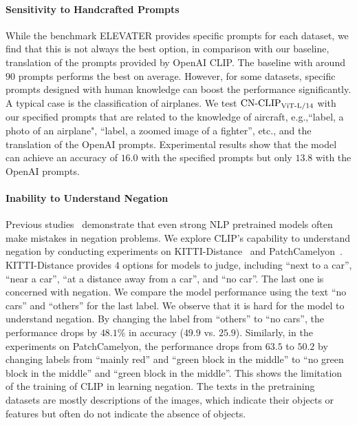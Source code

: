 \paragraph{Sensitivity to Handcrafted Prompts}
While the benchmark ELEVATER provides specific prompts for each dataset, we find that this is not always the best option, in comparison with our baseline, translation of the prompts provided by OpenAI CLIP. 
The baseline with around $90$ prompts performs the best on average. 
However, for some datasets, specific prompts designed with human knowledge can boost the performance significantly. 
A typical case is the classification of airplanes. 
We test $\text{CN-CLIP}\rm_{ViT\text{-}L/14}$ with our specified prompts that are related to the knowledge of aircraft, e.g.,``{label}, a photo of an airplane", ``{label}, a zoomed image of a fighter'', etc., and the translation of the OpenAI prompts.
Experimental results show that the model can achieve an accuracy of $16.0$ with the specified prompts but only $13.8$ with the OpenAI prompts. 


\paragraph{Inability to Understand Negation}
Previous studies~\citep{negbert, bertnot} demonstrate that even strong NLP pretrained models  often make mistakes in negation problems. 
We explore CLIP's capability to understand negation by conducting experiments on KITTI-Distance~\citep{kitti} and PatchCamelyon~\citep{patchcamelyon}. 
KITTI-Distance provides $4$ options for models to judge, including ``next to a car'', ``near a car'', ``at a distance away from a car'', and ``no car''. The last one is concerned with negation. 
We compare the model performance using the text ``no cars'' and ``others'' for the last label. 
We observe that it is hard for the model to understand negation. By changing the label from ``others'' to ``no cars'', the performance drops by $48.1\%$ in accuracy ($49.9$ vs. $25.9$). 
Similarly, in the experiments on PatchCamelyon, the performance drops from $63.5$ to $50.2$ by changing labels from ``mainly red'' and ``green block in the middle'' to ``no green block in the middle'' and ``green block in the middle''. 
This shows the limitation of the training of CLIP in learning negation. 
The texts in the pretraining datasets are mostly descriptions of the images, which indicate their objects or features but often do not indicate the absence of objects. 


